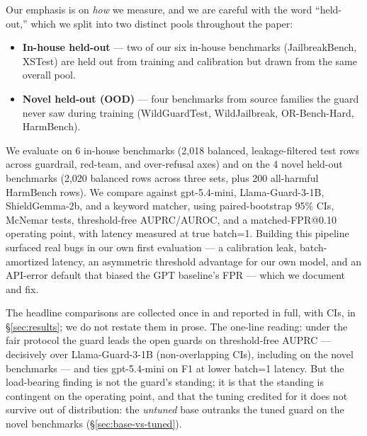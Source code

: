 \documentclass[sigconf,nonacm]{acmart}
\begin{document}
Our emphasis is on \emph{how} we measure, and we are careful with the word ``held-out,'' which we split into two distinct pools throughout the paper:

\begin{itemize}
  \item \textbf{In-house held-out} --- two of our six in-house benchmarks (JailbreakBench, XSTest) are held out from training and calibration but drawn from the same overall pool.
  \item \textbf{Novel held-out (OOD)} --- four benchmarks from source families the guard never saw during training (WildGuardTest, WildJailbreak, OR-Bench-Hard, HarmBench).
\end{itemize}

We evaluate on 6 in-house benchmarks (2,018 balanced, leakage-filtered test rows across guardrail, red-team, and over-refusal axes) and on the 4 novel held-out benchmarks (2,020 balanced rows across three sets, plus 200 all-harmful HarmBench rows). We compare against gpt-5.4-mini, Llama-Guard-3-1B, ShieldGemma-2b, and a keyword matcher, using paired-bootstrap 95\% CIs, McNemar tests, threshold-free AUPRC/AUROC, and a matched-FPR@0.10 operating point, with latency measured at true batch=1. Building this pipeline surfaced real bugs in our own first evaluation --- a calibration leak, batch-amortized latency, an asymmetric threshold advantage for our own model, and an API-error default that biased the GPT baseline's FPR --- which we document and fix.

The headline comparisons are collected once in  and reported in full, with CIs, in \S\ref{sec:results}; we do not restate them in prose. The one-line reading: under the fair protocol the guard leads the open guards on threshold-free AUPRC --- decisively over Llama-Guard-3-1B (non-overlapping CIs), including on the novel benchmarks --- and ties gpt-5.4-mini on F1 at lower batch=1 latency. But the load-bearing finding is not the guard's standing; it is that the standing is contingent on the operating point, and that the tuning credited for it does not survive out of distribution: the \emph{untuned} base outranks the tuned guard on the novel benchmarks (\S\ref{sec:base-vs-tuned}).
\end{document}
